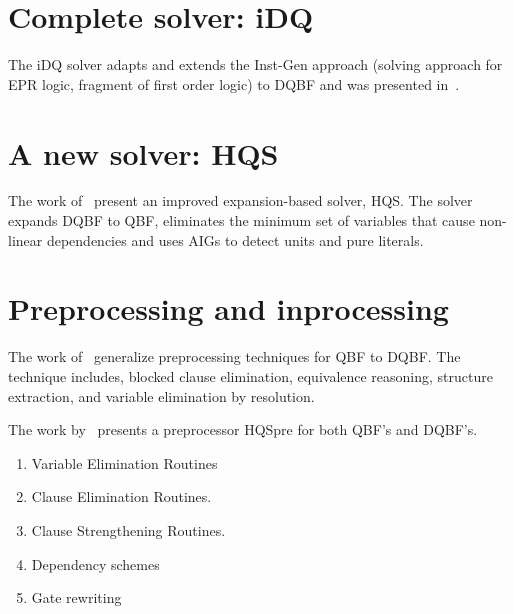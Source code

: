 \documentclass{article}
\begin{document}
\section{Complete solver: iDQ}
The iDQ solver adapts and extends the Inst-Gen approach (solving approach for EPR logic, fragment of first order logic) to DQBF and was presented in~\cite{frohlich2014idq}.

\section{A new solver: HQS}
The work of~\cite{gitina2015solving} present an improved expansion-based solver, HQS.
%
The solver expands DQBF to QBF, eliminates the minimum set of variables that cause non-linear
dependencies and uses AIGs to detect units and pure literals.

\section{Preprocessing and inprocessing}
The work of~\cite{wimmer2015preprocessing} generalize preprocessing techniques for QBF to DQBF. 
%
The technique includes, blocked clause elimination, equivalence reasoning, structure extraction, and variable elimination by resolution.

The work by~\cite{wimmer2017hqspre} presents a preprocessor HQSpre for both QBF's and DQBF's.
\begin{enumerate}
 \item Variable Elimination Routines
 \item Clause Elimination Routines.
 \item Clause Strengthening Routines. 
 \item Dependency schemes
 \item Gate rewriting
\end{enumerate}


\end{document}
